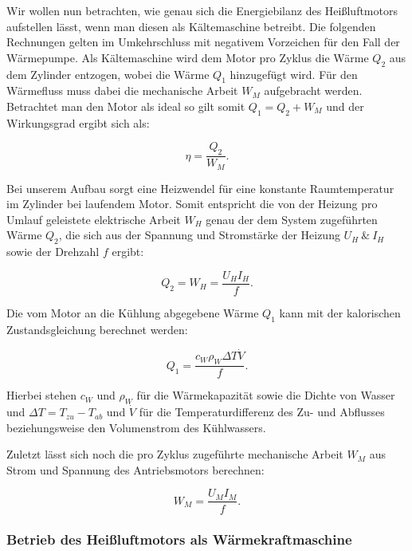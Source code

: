 \documentclass{article}
\begin{document}
Wir wollen nun betrachten, wie genau sich die Energiebilanz des Heißluftmotors aufstellen lässt, wenn man diesen als Kältemaschine betreibt. Die folgenden Rechnungen gelten im Umkehrschluss mit negativem Vorzeichen für den Fall der Wärmepumpe. Als Kältemaschine wird dem Motor pro Zyklus die Wärme $Q_2$ aus dem Zylinder entzogen, wobei die Wärme $Q_1$ hinzugefügt wird. Für den Wärmefluss muss dabei die mechanische Arbeit $W_M$ aufgebracht werden. Betrachtet man den Motor als ideal so gilt somit $Q_1 = Q_2 + W_M$ und der Wirkungsgrad ergibt sich als:

\begin{equation}
    \eta = \frac{Q_2}{W_M}.
    \label{eq:Kältemaschine-eta}
\end{equation}

Bei unserem Aufbau sorgt eine Heizwendel für eine konstante Raumtemperatur im Zylinder bei laufendem Motor. Somit entspricht die von der Heizung pro Umlauf geleistete elektrische Arbeit $W_H$ genau der dem System zugeführten Wärme $Q_2$, die sich aus der Spannung und Stromstärke der Heizung $U_H \ \& \ I_H$ sowie der Drehzahl $f$ ergibt:

\begin{equation}
    Q_2 = W_H = \frac{U_H I_H}{f}.
    \label{eq:Kältemaschine-Q_2}
\end{equation}

Die vom Motor an die Kühlung abgegebene Wärme $Q_1$ kann mit der kalorischen Zustandsgleichung berechnet werden: 

\begin{equation}
    Q_1 = \frac{c_W \rho_W \Delta T  \dot{V}}{f}.
    \label{eq:Kältemaschine-Q_1}
\end{equation}

Hierbei stehen $c_W$ und $\rho_W$ für die Wärmekapazität sowie die Dichte von Wasser und $\Delta T = T_{zu} - T_{ab}$ und $\dot{V}$ für die Temperaturdifferenz des Zu- und Abflusses beziehungsweise den Volumenstrom des Kühlwassers.

Zuletzt lässt sich noch die pro Zyklus zugeführte mechanische Arbeit $W_M$ aus Strom und Spannung des Antriebsmotors berechnen:

\begin{equation}
    W_M = \frac{U_M I_M}{f}.
    \label{eq:Kältemaschine-W_M}
\end{equation}


\subsubsection{Betrieb des Heißluftmotors als Wärmekraftmaschine}
\end{document}
